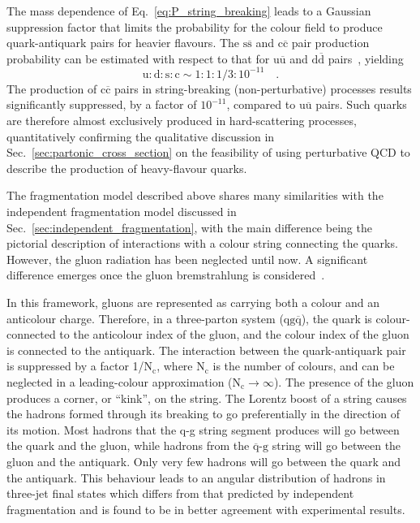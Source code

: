 The mass dependence of Eq.~\ref{eq:P_string_breaking} leads to a Gaussian suppression factor that limits the probability for the colour field to produce quark-antiquark pairs for heavier flavours. The $\mathrm{s\overline{s}}$ and $\mathrm{c\overline{c}}$ pair production probability can be estimated with respect to that for $\mathrm{u\overline{u}}$ and $\mathrm{d\overline{d}}$ pairs~\cite{Ferreres-Sole:2018vgo}, yielding
\begin{equation*}
    \mathrm{u : d : s : c} \sim 1 : 1 : 1/3 : 10^{-11}\quad .
\end{equation*}
The production of $\mathrm{c\overline{c}}$ pairs in string-breaking (non-perturbative) processes results significantly suppressed, by a factor of $10^{-11}$, compared to $\mathrm{u\overline{u}}$ pairs. Such quarks are therefore almost exclusively produced in hard-scattering processes, quantitatively confirming the qualitative discussion in Sec.~\ref{sec:partonic_cross_section} on the feasibility of using perturbative QCD to describe the production of heavy-flavour quarks.

The fragmentation model described above shares many similarities with the independent fragmentation model discussed in Sec.~\ref{sec:independent_fragmentation}, with the main difference being the pictorial description of interactions with a colour string connecting the quarks. However, the gluon radiation has been neglected until now. A significant difference emerges once the gluon bremstrahlung is considered~\cite{Sjostrand:1984ic}. 

In this framework, gluons are represented as carrying both a colour and an anticolour charge. Therefore, in a three-parton system ($\mathrm{qg\overline{q}}$), the quark is colour-connected to the anticolour index of the gluon, and the colour index of the gluon is connected to the antiquark. The interaction between the quark-antiquark pair is suppressed by a factor 1/$\mathrm{N_c}$, where $\mathrm{N_c}$ is the number of colours, and can be neglected in a leading-colour approximation ($\mathrm{N_c} \rightarrow\infty$). The presence of the gluon produces a corner, or “kink”, on the string. The Lorentz boost of a string causes the hadrons formed through its breaking to go preferentially in the direction of its motion. Most hadrons that the q-g string segment produces will go between the quark and the gluon, while hadrons from the $\mathrm{\overline{q}\text{-}g}$ string will go between the gluon and the antiquark. Only very few hadrons will go between the quark and the antiquark. This behaviour leads to an angular distribution of hadrons in \ee three-jet final states which differs from that predicted by independent fragmentation and is found to be in better agreement with experimental results. 

